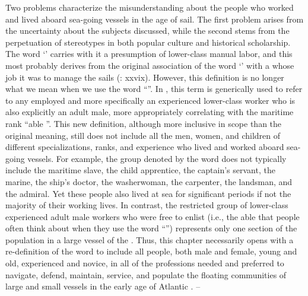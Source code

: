   Two problems characterize the misunderstanding about the people who worked and lived aboard sea-going vessels in the age of sail. The first problem arises from the uncertainty about the subjects discussed, while the second stems from the perpetuation of stereotypes in both popular culture and historical scholarship. The word ‘’ carries with it a presumption of lower-class manual labor, and this most probably derives from the original association of the word ‘’ with a  whose job it was to manage the sails (\citealt{AdkinsAdkins2008}: xxvix). However, this definition is no longer what we mean when we use the word “”. In ,  this term is generically used to refer to any employed  and more specifically an experienced lower-class worker who is also explicitly an adult male, more appropriately correlating with the maritime rank “able ”. This new definition, although more inclusive in scope than the original meaning, still does not include all the men, women, and children of different specializations, ranks, and experience who lived and worked aboard sea-going vessels. For example, the group denoted by the word does not typically include the maritime slave, the child apprentice, the captain’s servant, the marine, the ship’s doctor, the washerwoman, the carpenter, the landsman, and the admiral. Yet these people also lived at sea for significant periods if not the majority of their working lives. In contrast, the restricted group of lower-class experienced adult male workers who were free to enlist (i.e., the able  that people often think about when they use the word “”) represents only one section of the population in a large vessel of the . Thus, this chapter necessarily opens with a re-definition of the word to include all people, both male and female, young and old, experienced and novice, in all of the professions needed and preferred to navigate, defend, maintain, service, and populate the floating communities of large and small vessels in the early age of Atlantic . 
–
